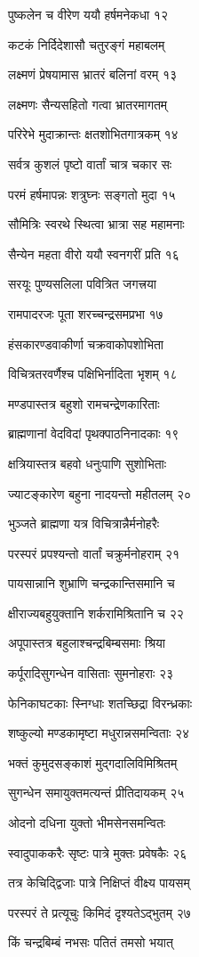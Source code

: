 पुष्कलेन च वीरेण ययौ हर्षमनेकधा १२

कटकं निर्दिदेशासौ चतुरङ्गं महाबलम्

लक्ष्मणं प्रेषयामास भ्रातरं बलिनां वरम् १३

लक्ष्मणः सैन्यसहितो गत्वा भ्रातरमागतम्

परिरेभे मुदाक्रान्तः क्षतशोभितगात्रकम् १४

सर्वत्र कुशलं पृष्टो वार्तां चात्र चकार सः

परमं हर्षमापन्नः शत्रुघ्नः सङ्गतो मुदा १५

सौमित्रिः स्वरथे स्थित्वा भ्रात्रा सह महामनाः

सैन्येन महता वीरो ययौ स्वनगरीं प्रति १६

सरयूः पुण्यसलिला पवित्रित जगत्त्रया

रामपादरजः पूता शरच्चन्द्रसमप्रभा १७

हंसकारण्डवाकीर्णा चक्रवाकोपशोभिता

विचित्रतरवर्णैश्च पक्षिभिर्नादिता भृशम् १८

मण्डपास्तत्र बहुशो रामचन्द्रेणकारिताः

ब्राह्मणानां वेदविदां पृथक्पाठनिनादकाः १९

क्षत्रियास्तत्र बहवो धनुःपाणि सुशोभिताः

ज्याटङ्कारेण बहुना नादयन्तो महीतलम् २०

भुञ्जते ब्राह्मणा यत्र विचित्रान्नैर्मनोहरैः

परस्परं प्रपश्यन्तो वार्तां चक्रुर्मनोहराम् २१

पायसान्नानि शुभ्राणि चन्द्रकान्तिसमानि च

क्षीराज्यबहुयुक्तानि शर्करामिश्रितानि च २२

अपूपास्तत्र बहुलाश्चन्द्रबिम्बसमाः श्रिया

कर्पूरादिसुगन्धेन वासिताः सुमनोहराः २३

फेनिकाघटकाः स्निग्धाः शतच्छिद्रा विरन्ध्रकाः

शष्कुल्यो मण्डकामृष्टा मधुरान्नसमन्विताः २४

भक्तं कुमुदसङ्काशं मुद्गदालिविमिश्रितम्

सुगन्धेन समायुक्तमत्यन्तं प्रीतिदायकम् २५

ओदनो दधिना युक्तो भीमसेनसमन्वितः

स्वादुपाककरैः सृष्टः पात्रे मुक्तः प्रवेषकैः २६

तत्र केचिद्द्विजाः पात्रे निक्षिप्तं वीक्ष्य पायसम्

परस्परं ते प्रत्यूचुः किमिदं दृश्यतेऽद्भुतम् २७

किं चन्द्रबिम्बं नभसः पतितं तमसो भयात्

